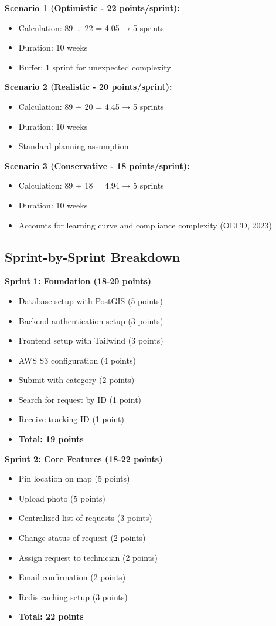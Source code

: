 \documentclass[12pt,a4paper]{article}
\begin{document}
\textbf{Scenario 1 (Optimistic - 22 points/sprint):}
\begin{itemize}
    \item Calculation: 89 ÷ 22 = 4.05 → 5 sprints
    \item Duration: 10 weeks
    \item Buffer: 1 sprint for unexpected complexity
\end{itemize}

\textbf{Scenario 2 (Realistic - 20 points/sprint):}
\begin{itemize}
    \item Calculation: 89 ÷ 20 = 4.45 → 5 sprints
    \item Duration: 10 weeks
    \item Standard planning assumption
\end{itemize}

\textbf{Scenario 3 (Conservative - 18 points/sprint):}
\begin{itemize}
    \item Calculation: 89 ÷ 18 = 4.94 → 5 sprints
    \item Duration: 10 weeks
    \item Accounts for learning curve and compliance complexity (OECD, 2023)
\end{itemize}

\subsection{Sprint-by-Sprint Breakdown}

\textbf{Sprint 1: Foundation (18-20 points)}
\begin{itemize}
    \item Database setup with PostGIS (5 points)
    \item Backend authentication setup (3 points)
    \item Frontend setup with Tailwind (3 points)
    \item AWS S3 configuration (4 points)
    \item Submit with category (2 points)
    \item Search for request by ID (1 point)
    \item Receive tracking ID (1 point)
    \item \textbf{Total: 19 points}
\end{itemize}

\textbf{Sprint 2: Core Features (18-22 points)}
\begin{itemize}
    \item Pin location on map (5 points)
    \item Upload photo (5 points)
    \item Centralized list of requests (3 points)
    \item Change status of request (2 points)
    \item Assign request to technician (2 points)
    \item Email confirmation (2 points)
    \item Redis caching setup (3 points)
    \item \textbf{Total: 22 points}
\end{itemize}
\end{document}
